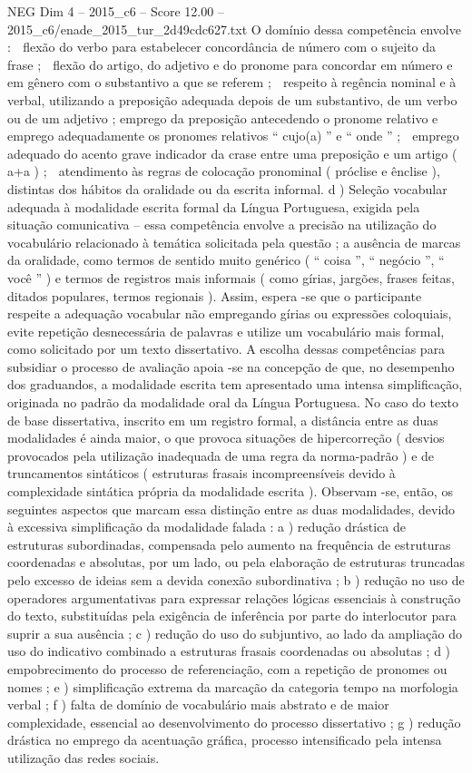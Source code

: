 \begin{textsample}{NEG Dim 4 – 2015\_c6 – Score 12.00 – 2015\_c6/enade\_2015\_tur\_2d49cdc627.txt}
O domínio dessa competência envolve :  flexão do verbo para estabelecer concordância de número com o sujeito da frase ;  flexão do artigo, do adjetivo e do pronome para concordar em número e em gênero com o substantivo a que se referem ;  respeito à regência nominal e à verbal, utilizando a preposição adequada depois de um substantivo, de um verbo ou de um adjetivo ; emprego da preposição antecedendo o pronome relativo e emprego adequadamente os pronomes relativos “ cujo(a) ” e “ onde ” ;  emprego adequado do acento grave indicador da crase entre uma preposição e um artigo ( a+a ) ;  atendimento às regras de colocação pronominal ( próclise e ênclise ), distintas dos hábitos da oralidade ou da escrita informal. d ) Seleção vocabular adequada à modalidade escrita formal da Língua Portuguesa, exigida pela situação comunicativa – essa competência envolve a precisão na utilização do vocabulário relacionado à temática solicitada pela questão ; a ausência de marcas da oralidade, como termos de sentido muito genérico ( “ coisa ”, “ negócio ”, “ você ” ) e termos de registros mais informais ( como gírias, jargões, frases feitas, ditados populares, termos regionais ).
Assim, espera -se que o participante respeite a adequação vocabular não empregando gírias ou expressões coloquiais, evite repetição desnecessária de palavras e utilize um vocabulário mais formal, como solicitado por um texto dissertativo.
A escolha dessas competências para subsidiar o processo de avaliação apoia -se na concepção de que, no desempenho dos graduandos, a modalidade escrita tem apresentado uma intensa simplificação, originada no padrão da modalidade oral da Língua Portuguesa.
No caso do texto de base dissertativa, inscrito em um registro formal, a distância entre as duas modalidades é ainda maior, o que provoca situações de hipercorreção ( desvios provocados pela utilização inadequada de uma regra da norma-padrão ) e de truncamentos sintáticos ( estruturas frasais incompreensíveis devido à complexidade sintática própria da modalidade escrita ).
Observam -se, então, os seguintes aspectos que marcam essa distinção entre as duas modalidades, devido à excessiva simplificação da modalidade falada : a ) redução drástica de estruturas subordinadas, compensada pelo aumento na frequência de estruturas coordenadas e absolutas, por um lado, ou pela elaboração de estruturas truncadas pelo excesso de ideias sem a devida conexão subordinativa ; b ) redução no uso de operadores argumentativas para expressar relações lógicas essenciais à construção do texto, substituídas pela exigência de inferência por parte do interlocutor para suprir a sua ausência ; c ) redução do uso do subjuntivo, ao lado da ampliação do uso do indicativo combinado a estruturas frasais coordenadas ou absolutas ; d ) empobrecimento do processo de referenciação, com a repetição de pronomes ou nomes ; e ) simplificação extrema da marcação da categoria tempo na morfologia verbal ; f ) falta de domínio de vocabulário mais abstrato e de maior complexidade, essencial ao desenvolvimento do processo dissertativo ; g ) redução drástica no emprego da acentuação gráfica, processo intensificado pela intensa utilização das redes sociais.

\end{textsample}

